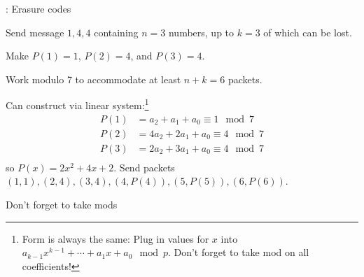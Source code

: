 \documentclass[12pt]{article}
\newcommand{\myspace}{\vspace{2\bigskipamount}}
\begin{document}
\myspace
{}: Erasure codes
\begin{compactitem}
	\item Send message $1, 4, 4$ containing $n=3$ numbers, up to $k=3$ of which can be lost. 
	\item Make $P(1) = 1$, $P(2) = 4$, and $P(3) = 4$. 
	\item Work modulo 7 to accommodate at least $n+k=6$ packets.
	\item Can construct via linear system:\footnote{Form is always the same: Plug in values for $x$ into $a_{k-1}x^{k-1} + \cdots + a_1 x + a_0 \mod{p}$. Don't forget to take mod on all coefficients!}
	\begin{align}
		P(1) &= a_2 + a_1 + a_0 \equiv 1 \mod{7} \\
		P(2) &= 4a_2 + 2a_1 + a_0 \equiv 4 \mod{7} \\
		P(3) &= 2a_2 + 3a_1 + a_0 \equiv 4 \mod{7} \\
	\end{align}
	so $P(x) = 2x^2 + 4x + 2$. Send packets $(1, 1), (2, 4), (3, 4), (4, P(4)), (5, P(5)), (6, P(6))$. \begin{scriptsize}Don't forget to take mods\end{scriptsize}
\end{compactitem}
\end{document}
